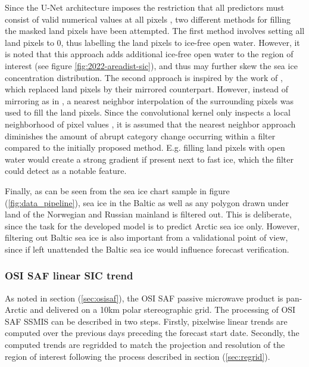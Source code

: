 \documentclass[../main/thesis]{subfiles}
\begin{document}
Since the U-Net architecture imposes the restriction that all predictors must consist of valid numerical values at all pixels \citep{Ronneberger2015}, two different methods for filling the masked land pixels have been attempted. The first method involves setting all land pixels to 0, thus labelling the land pixels to ice-free open water. However, it is noted that this approach adds additional ice-free open water to the region of interest (see figure \ref{fig:2022-areadist-sic}), and thus may further skew the sea ice concentration distribution. The second approach is inspired by the work of \citet{Wang2017}, which replaced land pixels by their mirrored counterpart. However, instead of mirroring as in \citet{Wang2017}, a nearest neighbor interpolation of the surrounding pixels was used to fill the land pixels. Since the convolutional kernel only inspects a local neighborhood of pixel values \citep{Yamashita2018}, it is assumed that the nearest neighbor approach diminishes the amount of abrupt category change occurring within a filter compared to the initially proposed method. E.g. filling land pixels with open water would create a strong gradient if present next to fast ice, which the filter could detect as a notable feature.

Finally, as can be seen from the sea ice chart sample in figure (\ref{fig:data_pipeline}), sea ice in the Baltic as well as any polygon drawn under land of the Norwegian and Russian mainland is filtered out. This is deliberate, since the task for the developed model is to predict Arctic sea ice only. However, filtering out Baltic sea ice is also important from a validational point of view, since if left unattended the Baltic sea ice would influence forecast verification. 

\subsubsection{OSI SAF linear SIC trend}
\label{sec:data_trend}
As noted in section (\ref{sec:osisaf}), the OSI SAF passive microwave product is pan-Arctic and delivered on a 10km polar stereographic grid. The processing of OSI SAF SSMIS can be described in two steps. Firstly, pixelwise linear trends are computed over the previous days preceding the forecast start date. Secondly, the computed trends are regridded to match the projection and resolution of the region of interest following the process described in section (\ref{sec:regrid}).

\end{document}
